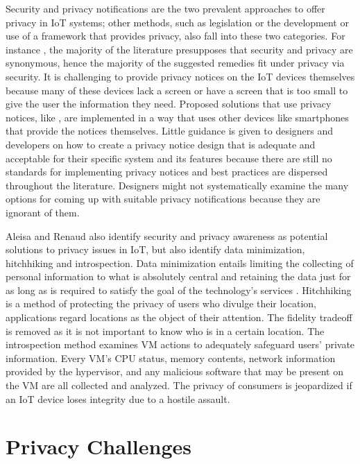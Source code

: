 \documentclass[manuscript,natbib=false]{acmart}
\begin{document}
Security and privacy notifications are the two prevalent approaches to
offer privacy in IoT systems; other methods, such as legislation or
the development or use of a framework that provides privacy, also
fall into these two categories. For instance \cite{opara2022framework, FabianoInternet, SunSecure},
the majority of the
literature presupposes that security and privacy are synonymous,
hence the majority of the suggested remedies fit under privacy via
security. It is challenging to provide privacy notices on the IoT
devices themselves because many of these devices lack a screen or
have a screen that is too small to give the user the information
they need. Proposed solutions that use privacy notices, like \cite{FengDesign},
are implemented in a way that uses other devices like smartphones
that provide the notices themselves. Little guidance is given to
designers and developers on how to create a privacy notice design
that is adequate and acceptable for their specific system and
its features because there are still no standards for implementing
privacy notices and best practices are dispersed throughout the
literature. Designers might not systematically examine the
many options for coming up with suitable privacy notifications
because they are ignorant of them.

Aleisa and Renaud \cite{aleisa2016privacy} also identify security and privacy
awareness as potential solutions to privacy issues in IoT, but also identify
data minimization, hitchhiking and introspection. Data minimization entails
limiting the collecting of personal information to what is absolutely central
and retaining the data just for as long as is required to satisfy the goal
of the technology's services \cite{ojDirective281}. Hitchhiking \cite{tang2006putting}
is a method of protecting the privacy of users who divulge their location,
applications regard locations as the object of their attention. The fidelity
tradeoff is removed as it is not important to know who is in a certain
location. The introspection \cite{kang2015protection} method examines VM
actions to adequately safeguard users' private information. Every VM's
CPU status, memory contents, network information provided by the hypervisor,
and any malicious software that may be present on the VM are all collected
and analyzed. The privacy of consumers is jeopardized if an IoT device
loses integrity due to a hostile assault.

\section{Privacy Challenges}
\end{document}
